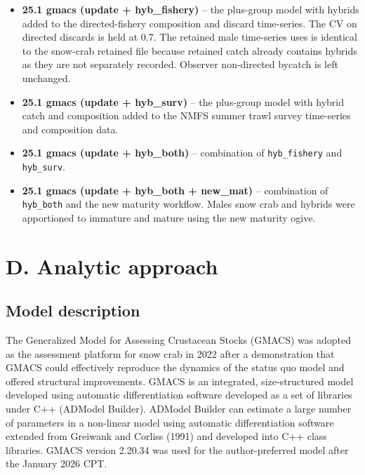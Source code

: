 \documentclass[
]{article}
\begin{document}
\begin{itemize}
\item
  \textbf{25.1 gmacs (update + hyb\_fishery)} -- the plus-group model with hybrids added to the directed-fishery composition and discard time-series. The CV on directed discards is held at 0.7. The retained male time-series uses is identical to the snow-crab retained file because retained catch already contains hybrids as they are not separately recorded. Observer non-directed bycatch is left unchanged.
\item
  \textbf{25.1 gmacs (update + hyb\_surv)} -- the plus-group model with hybrid catch and composition added to the NMFS summer trawl survey time-series and composition data.
\item
  \textbf{25.1 gmacs (update + hyb\_both)} -- combination of \texttt{hyb\_fishery} and \texttt{hyb\_surv}.
\item
  \textbf{25.1 gmacs (update + hyb\_both + new\_mat)} -- combination of \texttt{hyb\_both} and the new maturity workflow. Males snow crab and hybrids were apportioned to immature and mature using the new maturity ogive.
\end{itemize}

\section{D. Analytic approach}\label{d.-analytic-approach}

\subsection{Model description}\label{model-description}

The Generalized Model for Assessing Crustacean Stocks (GMACS) was adopted as the assessment platform for snow crab in 2022 after a demonstration that GMACS could effectively reproduce the dynamics of the status quo model and offered structural improvements. GMACS is an integrated, size-structured model developed using automatic differentiation software developed as a set of libraries under C++ (ADModel Builder). ADModel Builder can estimate a large number of parameters in a non-linear model using automatic differentiation software extended from Greiwank and Corliss (1991) and developed into C++ class libraries. GMACS version 2.20.34 was used for the author-preferred model after the January 2026 CPT.
\end{document}
